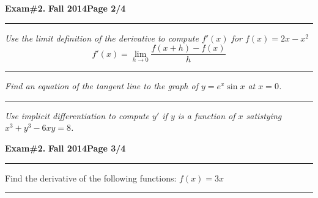 \hfill{\large\bf Exam\#2.}\hfill{\large\bf
  Fall 2014}\hfill{\large\bf Page 2/4}\hrule

\bigskip
{\problem[10 pts] \em Use the limit definition of the derivative to
compute $f'(x)$ for $f(x)=2x-x^2$}
\begin{equation*}
f'(x) = \lim_{h \to 0} \frac{ f(x+h)-f(x)}{h}
\end{equation*}
\vspace{2cm}
\begin{flushright}
\end{flushright}
\hrule
{\problem[20 pts] \em Find an equation of the tangent line to the graph
of $y=e^x \sin x$ at $x=0$.}
\vspace{4cm}
\begin{flushright}
\end{flushright}
\hrule
{\problem[20 pts] \em Use implicit differentiation to compute $y'$ if $y$ is a function of $x$ satistying $x^3+y^3-6xy=8$.}
\vspace{7cm}
\begin{flushright}
\end{flushright}
\newpage

\hfill{\large\bf Exam\#2.}\hfill{\large\bf
  Fall 2014}\hfill{\large\bf Page 3/4}\hrule

\bigskip
\noindent Find the derivative of the following functions:
{\problem[2 pts] $f(x)=3x$}
\begin{flushright}
\end{flushright}
\hrule

